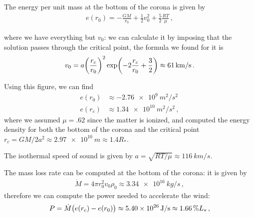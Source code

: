 \documentclass[main.tex]{subfiles}
\begin{document}
\begin{bluebox}
  The energy per unit mass at the bottom of the corona is given by 
  \begin{align}
    e(r_0 ) = - \frac{GM}{r_0 } + \frac{1}{2} v_0^2 + \frac{5}{2} \frac{RT}{\mu }
  \,,
  \end{align}

  where we have everything but \(v_0 \): we can calculate it by imposing that the solution passes through the critical point, the formula we found for it is 
  \begin{align}
  v_0 = a \qty(\frac{r_c}{r_0 })^2 \exp(- 2 \frac{r_c}{r_0 } + \frac{3}{2}) \approx \SI{61}{km/s}
  \,.
  \end{align}
  
  Using this figure, we can find 
  \begin{align}
  e(r_0 ) &\approx \SI{-2.76e9}{m^2/s^2}  \\ 
  e(r_c ) &\approx \SI{1.34e10}{m^2/s^2}
  \,,
  \end{align}
  where we assumed \(\mu = \num{.62}\) since the matter is ionized, and computed the energy density for both the bottom of the corona and the critical point \(r_c = GM/2a^2 \approx \SI{2.97e10}{m} \approx 1.4 R_{*}\).

  The isothermal speed of sound is given by \(a = \sqrt{RT/\mu } \approx \SI{116}{km/s}\). 

  The mass loss rate can be computed at the bottom of the corona: it is given by 
  \begin{align}
  \dot{M} = 4 \pi r_0 ^2 v_0 \rho_0 \approx \SI{3.34e16}{kg/s}
  \,,
  \end{align}
  therefore we can compute the power needed to accelerate the wind: 
  \begin{align}
  P = \dot{M} \qty(e(r_c) - e(r_0 )) \approx \SI{5.40e26}{J/s} \approx \SI{1.66}{\percent} L_{*}
  \,,
  \end{align}
  


\end{bluebox}
\end{document}
